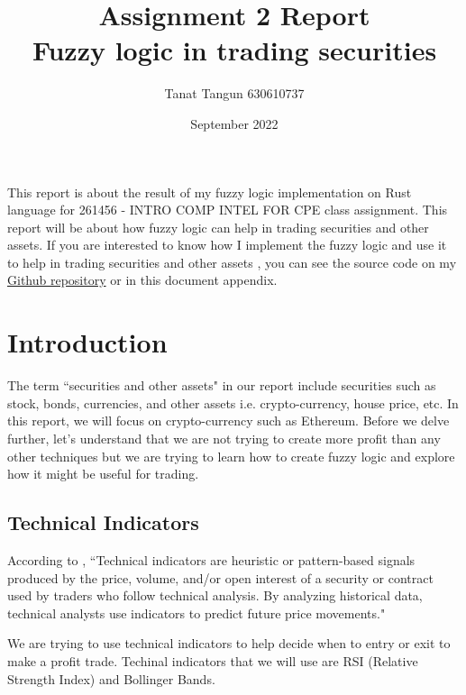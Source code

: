 \documentclass{article}
\title{
Assignment 2 Report\\
\large Fuzzy logic in trading securities
}
\author{Tanat Tangun 630610737}
\date{September 2022}
\begin{document}
\maketitle
This report is about the result of my fuzzy logic implementation on Rust language for 261456 - INTRO COMP INTEL FOR CPE class
assignment. This report will be about how fuzzy logic can help in trading securities and other assets. 
If you are interested to know how I implement the fuzzy logic and use it to help in trading securities and other assets
, you can see the source code on my 
\href{https://github.com/RiwEZ/FuzzyLogicOnRust}{Github repository} or in this document appendix.

\section*{Introduction}
The term ``securities and other assets" in our report include securities such as stock, bonds, currencies, and other assets
i.e. crypto-currency, house price, etc. In this report, we will focus on crypto-currency such as Ethereum. Before we delve 
further, let's understand that we are not trying to create more profit than any other techniques but we are trying to learn how
to create fuzzy logic and explore how it might be useful for trading.

\subsection*{Technical Indicators} 
\label{tech}
According to \cite{technical_indicator}, ``Technical indicators are heuristic or pattern-based signals produced by the price, volume, 
and/or open interest of a security or contract used by traders who follow technical analysis.
By analyzing historical data, technical analysts use indicators to predict future price movements."

We are trying to use technical indicators to help decide when to entry or exit to make a profit trade. Techinal indicators
that we will use are RSI (Relative Strength Index) and Bollinger Bands.
\end{document}
